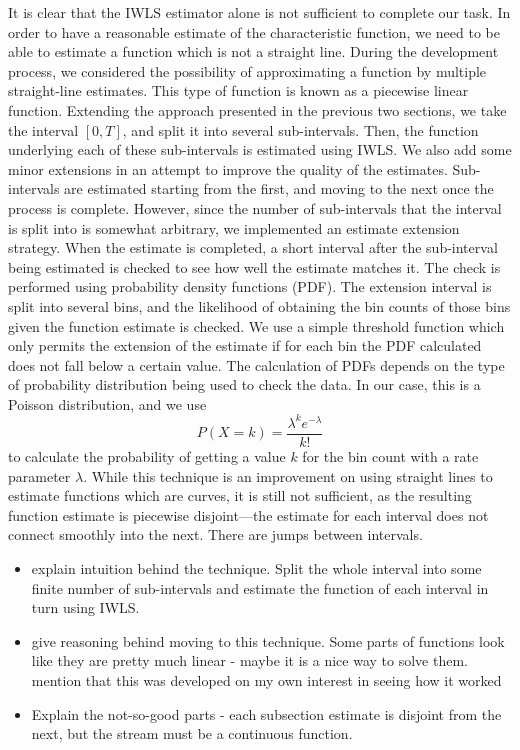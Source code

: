 \documentclass[a4paper,11pt]{article}
\begin{document}
    It is clear that the IWLS estimator alone is not sufficient to complete our
    task. In order to have a reasonable estimate of the characteristic function, we
    need to be able to estimate a function which is not a straight line. During the
    development process, we considered the possibility of approximating a function
    by multiple straight-line estimates. This type of function is known as a
    piecewise linear function. Extending the approach presented in the previous two
    sections, we take the interval $[0,T]$, and split it into several
    sub-intervals. Then, the function underlying each of these sub-intervals is
    estimated using IWLS. We also add some minor extensions in an attempt to improve
    the quality of the estimates. Sub-intervals are estimated starting from the
    first, and moving to the next once the process is complete. However, since the
    number of sub-intervals that the interval is split into is somewhat arbitrary,
    we implemented an estimate extension strategy. When the estimate is completed, a
    short interval after the sub-interval being estimated is checked to see how well
    the estimate matches it. The check is performed using probability density
    functions (PDF). The extension interval is split into several bins, and the
    likelihood of obtaining the bin counts of those bins given the function estimate
    is checked. We use a simple threshold function which only permits the extension
    of the estimate if for each bin the PDF calculated does not fall below a certain
    value. The calculation of PDFs depends on the type of probability distribution
    being used to check the data. In our case, this is a Poisson distribution, and
    we use
    \begin{equation}
    P(X=k)=\frac{\lambda^ke^{-\lambda}}{k!}
    \end{equation}
    to calculate the probability of getting a value $k$ for the bin count with a
    rate parameter $\lambda$. While this technique is an improvement on using
    straight lines to estimate functions which are curves, it is still not
    sufficient, as the resulting function estimate is piecewise disjoint---the
    estimate for each interval does not connect smoothly into the next. There are
    jumps between intervals.
\begin{itemize}
\item explain intuition behind the technique. Split the whole interval into some
  finite number of sub-intervals and estimate the function of each interval in
  turn using IWLS.
\item give reasoning behind moving to this technique. Some parts of functions look
  like they are pretty much linear - maybe it is a nice way to solve
  them. mention that this was developed on my own interest in seeing how it worked
\item Explain the not-so-good parts - each subsection estimate is disjoint from the
  next, but the stream must be a continuous function.
\end{itemize}
\end{document}
